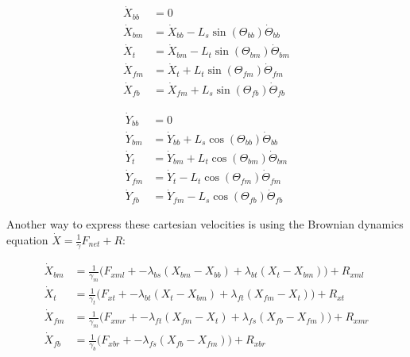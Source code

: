 \documentclass[10pt]{article} %
\begin{document}
\noindent\begin{minipage}{0.49\linewidth}
\begin{align}
  \dot{X}_{bb} &= 0 \\
  \dot{X}_{bm} &= \dot{X}_{bb} - L_{s}\sin(\Theta_{bb})\dot{\Theta}_{bb} \label{cartesian-bmx}\\
  \dot{X}_{t } &= \dot{X}_{bm} - L_{t}\sin(\Theta_{bm})\dot{\Theta}_{bm} \\
  \dot{X}_{fm} &= \dot{X}_{t } + L_{t}\sin(\Theta_{fm})\dot{\Theta}_{fm} \\
  \dot{X}_{fb} &= \dot{X}_{fm} + L_{s}\sin(\Theta_{fb})\dot{\Theta}_{fb}
\end{align}
\end{minipage}
\begin{minipage}{0.49\linewidth}
\begin{align}                                                                          
  \dot{Y}_{bb} &= 0 \\                                                        
  \dot{Y}_{bm} &= \dot{Y}_{bb} + L_{s}\cos(\Theta_{bb})\dot{\Theta}_{bb} \\
  \dot{Y}_{t}  &= \dot{Y}_{bm} + L_{t}\cos(\Theta_{bm})\dot{\Theta}_{bm} \\
  \dot{Y}_{fm} &= \dot{Y}_{t } - L_{t}\cos(\Theta_{fm})\dot{\Theta}_{fm} \\
  \dot{Y}_{fb} &= \dot{Y}_{fm} - L_{s}\cos(\Theta_{fb})\dot{\Theta}_{fb}
\end{align}
\end{minipage}
\vspace{.5cm}

Another way to express these cartesian velocities is using the Brownian dynamics equation $\dot{X} = \frac1\gamma F_{net} + R$:

\begin{align}  
  \dot{X}_{bm} &= \frac{1}{\gamma_m} \Big(F_{xml} + - \lambda_{bs}(X_{bm} - X_{bb}) + \lambda_{bt}(X_{t } - X_{bm}) \Big) + R_{xml} \label{brownian-bmx}\\
  \dot{X}_{t } &= \frac{1}{\gamma_t} \Big(F_{xt } + - \lambda_{bt}(X_{t } - X_{bm}) + \lambda_{ft}(X_{fm} - X_{t }) \Big) + R_{xt } \\
  \dot{X}_{fm} &= \frac{1}{\gamma_m} \Big(F_{xmr} + - \lambda_{ft}(X_{fm} - X_{t }) + \lambda_{fs}(X_{fb} - X_{fm}) \Big) + R_{xmr} \\
  \dot{X}_{fb} &= \frac{1}{\gamma_b} \Big(F_{xbr} + - \lambda_{fs}(X_{fb} - X_{fm}) \Big) + R_{xbr}
\end{align}
\end{document}
